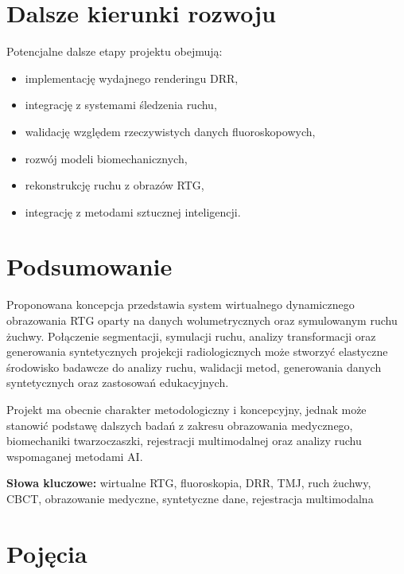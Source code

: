 \documentclass[11pt,a4paper]{article}
\begin{document}
\section{Dalsze kierunki rozwoju}

Potencjalne dalsze etapy projektu obejmują:
\begin{itemize}
\item implementację wydajnego renderingu DRR,
\item integrację z systemami śledzenia ruchu,
\item walidację względem rzeczywistych danych fluoroskopowych,
\item rozwój modeli biomechanicznych,
\item rekonstrukcję ruchu z obrazów RTG,
\item integrację z metodami sztucznej inteligencji.
\end{itemize}

\section{Podsumowanie}

Proponowana koncepcja przedstawia system wirtualnego dynamicznego obrazowania RTG oparty na danych wolumetrycznych oraz symulowanym ruchu żuchwy. Połączenie segmentacji, symulacji ruchu, analizy transformacji oraz generowania syntetycznych projekcji radiologicznych może stworzyć elastyczne środowisko badawcze do analizy ruchu, walidacji metod, generowania danych syntetycznych oraz zastosowań edukacyjnych.

Projekt ma obecnie charakter metodologiczny i koncepcyjny, jednak może stanowić podstawę dalszych badań z zakresu obrazowania medycznego, biomechaniki twarzoczaszki, rejestracji multimodalnej oraz analizy ruchu wspomaganej metodami AI.

\vspace{1cm}

\noindent
\textbf{Słowa kluczowe:}
wirtualne RTG,
fluoroskopia,
DRR,
TMJ,
ruch żuchwy,
CBCT,
obrazowanie medyczne,
syntetyczne dane,
rejestracja multimodalna



\section{ }




\section{Pojęcia}
\end{document}
